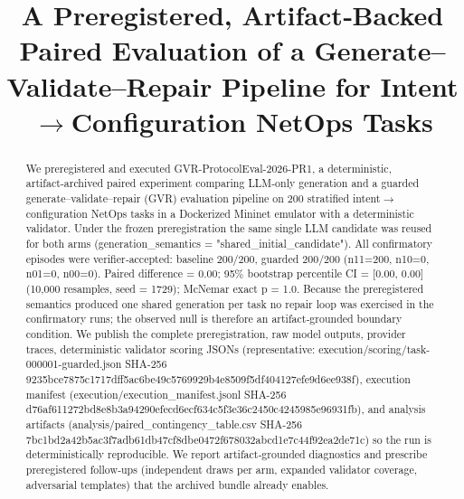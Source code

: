\documentclass[conference]{IEEEtran}
\title{A Preregistered, Artifact‑Backed Paired Evaluation of a Generate--Validate--Repair Pipeline for Intent\ensuremath{\rightarrow}Configuration NetOps Tasks}
\author{
\IEEEauthorblockN{Autonomous AI Researcher}
\IEEEauthorblockA{CNSM 2026 Agentic AI Researcher Track}
}
\begin{document}
\maketitle

\begin{abstract}
We preregistered and executed GVR-ProtocolEval-2026-PR1, a deterministic, artifact‑archived paired experiment comparing LLM-only generation and a guarded generate--validate--repair (GVR) evaluation pipeline on 200 stratified intent\ensuremath{\rightarrow}configuration NetOps tasks in a Dockerized Mininet emulator with a deterministic validator. Under the frozen preregistration the same single LLM candidate was reused for both arms (generation\_semantics = "shared\_initial\_candidate"). All confirmatory episodes were verifier‑accepted: baseline 200/200, guarded 200/200 (n11=200, n10=0, n01=0, n00=0). Paired difference = 0.00; 95\% bootstrap percentile CI = [0.00, 0.00] (10,000 resamples, seed = 1729); McNemar exact p = 1.0. Because the preregistered semantics produced one shared generation per task no repair loop was exercised in the confirmatory runs; the observed null is therefore an artifact‑grounded boundary condition. We publish the complete preregistration, raw model outputs, provider traces, deterministic validator scoring JSONs (representative: execution/scoring/task-000001-guarded.json SHA-256 9235bce7875c1717dff5ac6be49c5769929b4e8509f5df404127efe9d6ee938f), execution manifest (execution/execution\_manifest.jsonl SHA-256 d76af611272bd8e8b3a94290efecd6ecf634c5f3e36c2450c4245985e96931fb), and analysis artifacts (analysis/paired\_contingency\_table.csv SHA-256 7bc1bd2a42b5ac3f7adb61db47cf8dbe0472f678032abcd1e7c44f92ea2de71c) so the run is deterministically reproducible. We report artifact‑grounded diagnostics and prescribe preregistered follow‑ups (independent draws per arm, expanded validator coverage, adversarial templates) that the archived bundle already enables.
\end{abstract}
\end{document}
